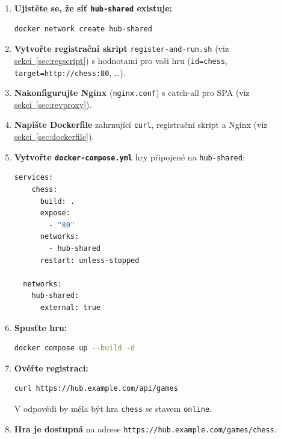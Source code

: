 \documentclass[12pt,a4paper]{article}
\begin{document}
\begin{enumerate}[label=\textbf{Krok \arabic*.},leftmargin=*]

  \item \textbf{Ujistěte se, že síť \texttt{hub-shared} existuje:}
\begin{lstlisting}[language=bash, numbers=none]
  docker network create hub-shared
\end{lstlisting}

  \item \textbf{Vytvořte registrační skript} \texttt{register-and-run.sh} (viz \hyperref[sec:regscript]{sekci~\ref*{sec:regscript}}) s hodnotami pro vaši hru (\texttt{id=chess}, \texttt{target=http://chess:80}, \ldots).

  \item \textbf{Nakonfigurujte Nginx} (\texttt{nginx.conf}) s catch-all pro SPA (viz \hyperref[sec:revproxy]{sekci~\ref*{sec:revproxy}}).

  \item \textbf{Napište Dockerfile} zahrnující \texttt{curl}, registrační skript a Nginx (viz \hyperref[sec:dockerfile]{sekci~\ref*{sec:dockerfile}}).

  \item \textbf{Vytvořte \texttt{docker-compose.yml}} hry připojené na \texttt{hub-shared}:
\begin{lstlisting}[language=bash, numbers=none]
  services:
    chess:
      build: .
      expose:
        - "80"
      networks:
        - hub-shared
      restart: unless-stopped

  networks:
    hub-shared:
      external: true
\end{lstlisting}

  \item \textbf{Spusťte hru:}
\begin{lstlisting}[language=bash, numbers=none]
  docker compose up --build -d
\end{lstlisting}

  \item \textbf{Ověřte registraci:}
\begin{lstlisting}[language=bash, numbers=none]
  curl https://hub.example.com/api/games
\end{lstlisting}
  V odpovědi by měla být hra \texttt{chess} se stavem \texttt{online}.

  \item \textbf{Hra je dostupná} na adrese \texttt{https://hub.example.com/games/chess}.

\end{enumerate}
\end{document}
